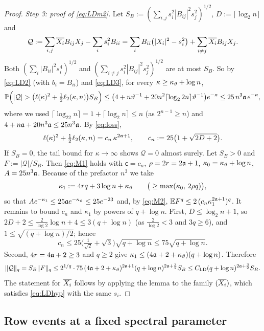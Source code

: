 \begin{proof}
\emph{Step 3: proof of \eqref{eq:LDm2}.} Let $S_B:=(\sum_{i,j}s_i^2|B_{ij}|^2s_j^2)^{1/2}$, $D:=\lceil\log_2n\rceil$ and
\[
 \mathcal Q:=\sum_{i,j}\overline{X_i}B_{ij}X_j-\sum_is_i^2B_{ii}=\sum_iB_{ii}\big(|X_i|^2-s_i^2\big)+\sum_{i\ne j}\overline{X_i}B_{ij}X_j .
\]
Both $(\sum_i|B_{ii}|^2s_i^4)^{1/2}$ and $(\sum_{i\ne j}s_i^2|B_{ij}|^2s_j^2)^{1/2}$ are at most $S_B$. So by \eqref{eq:LD2} (with $b_i=B_{ii}$) and \eqref{eq:LD3}, for every $\kappa\ge\kappa_\vartheta+\log n$,
\[
 \PP\Big(|\mathcal Q|>\big(\ell(\kappa)^2+\tfrac12\ell_2(\kappa,n)\big)S_B\Big)\le\big(4+n\vth^{-1}+20n^2\lceil\log_22n\rceil\vth^{-1}\big)e^{-\kappa}\le25\,n^3\fa\,e^{-\kappa},
\]
where we used $\lceil\log_22n\rceil=1+\lceil\log_2n\rceil\le n$ (as $2^{n-1}\ge n$) and $4+n\mathfrak{a}+20n^3\mathfrak{a}\le25n^3\mathfrak{a}$. By \eqref{eq:loss},
\[
 \ell(\kappa)^2+\tfrac12\ell_2(\kappa,n)=c_n\,\kappa^{2\mathfrak{a}+1},\qquad c_n:=25\big(1+\sqrt{2D+2}\big).
\]
If $S_B=0$, the tail bound for $\kappa\to\infty$ shows $\mathcal Q=0$ almost surely. Let $S_B>0$ and $F:=|\mathcal Q|/S_B$. Then \eqref{eq:M1} holds with $\mathsf c=c_n$, $\rho=2r=2\mathfrak{a}+1$, $\kappa_0=\kappa_\vartheta+\log n$, $A=25n^3\mathfrak{a}$.
Because of the prefactor $n^3$ we take
\[
 \kappa_1:=4rq+3\log n+\kappa_\vartheta\qquad\big(\ge\max(\kappa_0,\,2\rho q)\big),
\]
so that $Ae^{-\kappa_1}\le25\mathfrak{a} e^{-\kappa_\vartheta}\le25e^{-23}$ and, by \eqref{eq:M2}, $\mathbb{E} F^q\le2\,(c_n\kappa_1^{2\mathfrak{a}+1})^q$. It remains to bound $c_n$ and $\kappa_1$ by powers of $q+\log n$. First,
$D\le\log_2n+1$, so $2D+2\le\frac2{\log2}\log n+4\le3(q+\log n)$ (as $\frac2{\log 2}<3$ and $3q\ge6$), and $1\le\sqrt{(q+\log n)/2}$; hence
\[
 c_n\le25\big(\tfrac1{\sqrt2}+\sqrt3\big)\sqrt{q+\log n}\le75\sqrt{q+\log n}.
\]
Second, $4r=4\mathfrak{a}+2\ge3$ and $q\ge2$ give $\kappa_1\le(4\mathfrak{a}+2+\kappa_\vartheta)(q+\log n)$. Therefore
\[
 \|\mathcal Q\|_q=S_B\|F\|_q\le2^{1/q}\cdot75\,(4\mathfrak{a}+2+\kappa_\vartheta)^{2\mathfrak{a}+1}(q+\log n)^{2\mathfrak{a}+\frac32}S_B\le C_{\rm LD}(q+\log n)^{2\mathfrak{a}+\frac32}S_B .
\]
The statement for $\overline{X_i}$ follows by applying the lemma to the family $(\overline{X_i})$, which satisfies \eqref{eq:LDhyp} with the same $s_i$.
\end{proof}
\subsection{Row events at a fixed spectral parameter}
